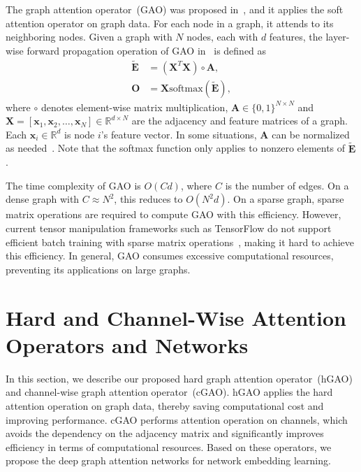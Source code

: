 \documentclass[sigconf]{acmart}
\begin{document}
The graph attention operator~(GAO) was proposed
in~\cite{velivckovic2017graph}, and it applies the soft attention
operator on graph data. For each node in a graph, it attends to its
neighboring nodes. Given a graph with $N$ nodes, each with $d$
features, the layer-wise forward propagation operation of GAO
in~\cite{velivckovic2017graph} is defined as
\begin{equation}
\begin{aligned}
\boldsymbol {\tilde E} &= (\boldsymbol X^T \boldsymbol X) \circ \boldsymbol A,\\
\boldsymbol O &= \boldsymbol X \mbox{softmax}(\boldsymbol{\tilde E}),
\end{aligned}
\end{equation}
where $\circ$ denotes element-wise matrix multiplication, $\boldsymbol A \in
\{0,1\}^{N\times N}$ and $\boldsymbol X = [\boldsymbol x_1, \boldsymbol x_2,
\ldots, \boldsymbol x_N] \in \mathbb{R}^{d\times N}$ are the adjacency and
feature matrices of a graph. Each $\boldsymbol x_i \in \mathbb{R}^{d}$ is node
$i$'s feature vector. In some situations, $\boldsymbol A$ can be normalized as
needed~\cite{kipf2016semi}. Note that the softmax function only applies to
nonzero elements of $\boldsymbol{\tilde E}$.

The time complexity of GAO is $O(Cd)$, where $C$ is
the number of edges. On a dense graph with $C \approx N^2$, this
reduces to $O(N^2d)$. On a sparse graph, sparse matrix operations
are required to compute GAO with this efficiency. However, current
tensor manipulation frameworks such as TensorFlow do not support
efficient batch training with sparse matrix
operations~\cite{velivckovic2017graph}, making it hard to achieve
this efficiency. In general, GAO consumes excessive computational
resources, preventing its applications on large graphs.







\section{Hard and Channel-Wise Attention Operators and Networks}\label{sec:networks}

In this section, we describe our proposed hard graph attention
operator~(hGAO) and channel-wise graph attention operator~(cGAO).
hGAO applies the hard attention operation on graph data, thereby
saving computational cost and improving performance. cGAO performs
attention operation on channels, which avoids the dependency on
the adjacency matrix and significantly improves efficiency
in terms of computational resources. Based on these operators, we
propose the deep graph attention networks for network embedding
learning.
\end{document}
